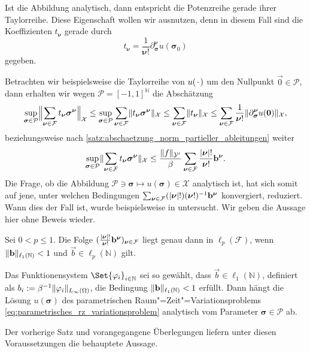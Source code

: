 \documentclass[../main.tex]{subfiles}
\begin{document}
Ist die Abbildung analytisch, dann entspricht die Potenzreihe gerade ihrer Taylorreihe.
Diese Eigenschaft wollen wir ausnutzen, denn in diesem Fall sind die Koeffizienten $t_{\bm \nu}$ gerade durch
\begin{equation}
    t_{\bm \nu} = \frac{1}{\bm\nu!} \partial^{\bm \nu}_{\bm \sigma} u(\bm \sigma_{0})
\end{equation}
gegeben.

Betrachten wir beispielsweise die Taylorreihe von $u(\blank)$ um den Nullpunkt $\vec 0 \in \mathcal P$, dann erhalten wir wegen $\mathcal P = [-1, 1]^{\mathbb{N}}$ die Abschätzung
\begin{equation}
    \sup_{\bm\sigma \in \mathcal P} \norm[\Big]{\sum_{\bm\nu \in \mathcal F} t_{\bm\nu} \bm\sigma^{\bm\nu}}_{\mathcal X}
    \leq \sup_{\bm\sigma \in \mathcal P} \sum_{\bm\nu \in \mathcal F} \norm{t_{\bm\nu} \bm\sigma^{\bm\nu}}_{\mathcal X}
    \leq \sum_{\bm\nu \in \mathcal F} \norm{t_{\bm\nu}}_{\mathcal X}
    \leq \sum_{\bm \nu \in \mathcal F} \frac{1}{\bm\nu!} \norm{ \partial^{\bm \nu}_{\bm \sigma} u(\vec 0)}_{\mathcal X},
\end{equation}
beziehungsweise nach \cref{satz:abschaetzung_norm_partieller_ableitungen} weiter
\begin{equation}
    \sup_{\bm\sigma \in \mathcal P} \norm{\sum_{\bm\nu \in \mathcal F} t_{\bm\nu} \bm\sigma^{\bm\nu}}_{\mathcal X}
    \leq \frac{\norm{f}_{\mathcal Y'}}{\beta} \sum_{\bm \nu \in \mathcal F} \frac{\abs{\bm\nu}!}{\bm\nu!} \vec b^{\bm\nu}.
\end{equation}
Die Frage, ob die Abbildung $\mathcal P \ni \bm \sigma \mapsto u(\bm \sigma) \in \mathcal X$ analytisch ist, hat sich somit auf jene, unter welchen Bedingungen $\sum_{\bm \nu \in \mathcal F} (\abs{\bm\nu}!)(\bm\nu!)^{-1} \vec b^{\bm\nu}$ konvergiert, reduziert.
Wann dies der Fall ist, wurde beispielsweise in \cite[Theorem 7.2]{Cohen:2010kz} untersucht.
Wir geben die Aussage hier ohne Beweis wieder.

\begin{Satz}
\label{satz:cohen2010kz:theorem72}
    Sei $0 < p \leq 1$.
    Die Folge $(\frac{\abs{\bm\nu}!}{\bm\nu!} \vec b^{\bm\nu})_{\bm\nu \in \mathcal F}$ liegt genau dann in $\ell_{p}(\mathcal F)$, wenn $\norm{\vec b}_{\ell_{1}(\mathbb{N})} < 1$ und $\vec b \in \ell_{p}(\mathbb{N})$ gilt.
\end{Satz}

\begin{Satz}
\label{satz:loesungen_analytisch}
    Das Funktionensystem $\Set{\varphi_{i}}_{i \in \mathbb{N}}$ sei so gewählt, dass $\vec b \in \ell_{1}(\mathbb{N})$, definiert als $b_{i} := \beta^{-1} \norm{\varphi_{i}}_{L_{\infty}(\Omega)}$, die Bedingung $\norm{\vec b}_{\ell_{1}(\mathbb{N})} < 1$ erfüllt.
    Dann hängt die Lösung $u(\bm \sigma)$ des parametrischen Raum"=Zeit"=Variationsproblems \cref{eq:parametrisches_rz_variationsproblem} analytisch vom Parameter $\bm \sigma \in \mathcal P$ ab.

    \begin{Beweis}
        Der vorherige Satz und vorangegangene Überlegungen liefern unter diesen Voraussetzungen die behauptete Aussage.
    \end{Beweis}
\end{Satz}
\end{document}
